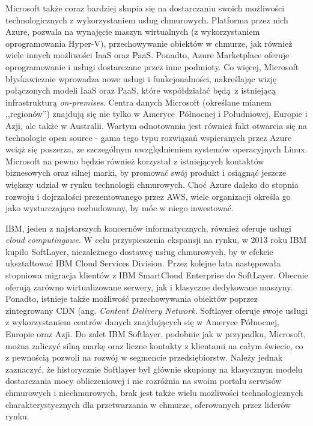 \documentclass[12pt,a4paper,twoside]{article}
\begin{document}
Microsoft także coraz bardziej skupia się na dostarczaniu swoich możliwości technologicznych z wykorzystaniem usług chmurowych. Platforma przez nich Azure, pozwala na wynajęcie maszyn wirtualnych (z wykorzystaniem oprogramowania Hyper-V), przechowywanie obiektów w chmurze, jak również wiele innych możliwości IaaS oraz PaaS. Ponadto, Azure Marketplace oferuje oprogramowanie i usługi dostarczane przez inne podmioty. Co więcej, Microsoft błyskawicznie wprowadza nowe usługi i funkcjonalności, nakreślając wizję połączonych modeli IaaS oraz PaaS, które współdziałać będą z istniejącą infrastrukturą \textit{on-premises}.  Centra danych Microsoft (określane mianem ,,regionów'') znajdują się nie tylko w Ameryce Północnej i Południowej, Europie i Azji, ale także w Australii. Wartym odnotowania jest również fakt otwarcia się na technologie open source - gama tego typu rozwiązań wspieranych przez Azure wciąż się poszerza, ze szczególnym uwzględnieniem systemów operacyjnych Linux. Microsoft na pewno będzie również korzystał z istniejących kontaktów biznesowych oraz silnej marki, by promować swój produkt i osiągnąć jeszcze większy udział w rynku technologii chmurowych. Choć Azure daleko do stopnia rozwoju i dojrzałości prezentowanego przez AWS, wiele organizacji określa go jako wystarczająco rozbudowany, by móc w niego inwestować.

IBM, jeden z najstarszych koncernów informatycznych, również oferuje usługi \textit{cloud computingowe}. W celu przyspieszenia ekspansji na rynku, w 2013 roku IBM kupiło SoftLayer, niezależnego dostawcę usług chmurowych, by w efekcie ukształtować IBM Cloud Services Division. Przez kolejne lata następowała stopniowa migracja klientów z IBM SmartCloud Enterprise do SoftLayer. Obecnie oferują zarówno wirtualizowane serwery, jak i klasyczne dedykowane maszyny. Ponadto, istnieje także możliwość przechowywania obiektów poprzez zintegrowany CDN (ang. \textit{Content Delivery Network}. Softlayer oferuje swoje usługi z wykorzystaniem centrów danych znajdujących się w Ameryce Północnej, Europie oraz Azji. Do zalet IBM Softlayer, podobnie jak w przypadku, Microsoft, można zaliczyć silną markę oraz liczne kontakty z klientami na całym świecie, co z pewnością pozwoli na rozwój w segmencie przedsiębiorstw. Należy jednak zaznaczyć, że historycznie Softlayer był głównie skupiony na klasycznym modelu dostarczania mocy obliczeniowej i nie rozróżnia na swoim portalu serwisów chmurowych i niechmurowych, brak jest także wielu możliwości technologicznych charakterystycznych dla przetwarzania w chmurze, oferowanych przez liderów rynku.
\end{document}
